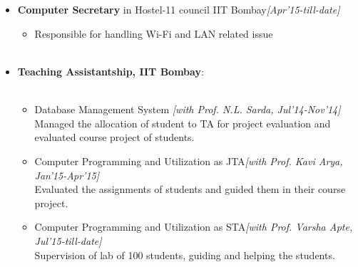 \\[-0.9cm]\\
\begin{itemize}
        \item \textbf{Computer Secretary} in Hostel-11 council IIT Bombay\hfill \emph{[Apr'15-till-date]}\hfill \\[-0.7cm]
	\begin{itemize}
		\item Responsible for handling Wi-Fi and LAN related issue \\[- 1.1cm]\\
	\end{itemize}	
	\item \textbf{Teaching Assistantship, IIT Bombay}: \hfill \\[- 1.1cm]\\
	\begin{itemize}
		\item Database Management System \hfill \emph{[with Prof. N.L. Sarda, Jul'14-Nov'14]}\\
			Managed the allocation of student to TA for project evaluation and evaluated course project of students.
		\item Computer Programming and Utilization as JTA\hfill \emph{[with Prof. Kavi Arya, Jan'15-Apr'15]}\\
			Evaluated the assignments of students and guided them in their course project.
		\item Computer Programming and Utilization as STA\hfill \emph{[with Prof. Varsha Apte, Jul'15-till-date]}\\
			Supervision of lab of 100 students, guiding and helping the students.\\[-0.6cm]
	\end{itemize}
\end{itemize}
